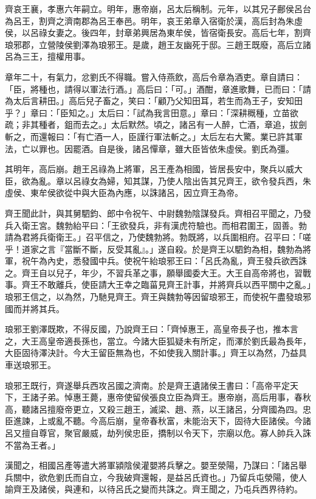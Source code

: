 \begin{pinyinscope}
齊哀王襄，孝惠六年嗣立。明年，惠帝崩，呂太后稱制。元年，以其兄子鄜侯呂台為呂王，割齊之濟南郡為呂王奉邑。明年，哀王弟章入宿衛於漢，高后封為朱虛侯，以呂祿女妻之。後四年，封章弟興居為東牟侯，皆宿衛長安。高后七年，割齊琅邪郡，立營陵侯劉澤為琅邪王。是歲，趙王友幽死于邸。三趙王既廢，高后立諸呂為三王，擅權用事。

章年二十，有氣力，忿劉氏不得職。嘗入侍燕飲，高后令章為酒吏。章自請曰：「臣，將種也，請得以軍法行酒。」高后曰：「可。」酒酣，章進歌舞，已而曰：「請為太后言耕田。」高后兒子畜之，笑曰：「顧乃父知田耳，若生而為王子，安知田乎？」章曰：「臣知之。」太后曰：「試為我言田意。」章曰：「深耕穊種，立苗欲疏；非其種者，鉏而去之。」太后默然。頃之，諸呂有一人醉，亡酒，章追，拔劍斬之，而還報曰：「有亡酒一人，臣謹行軍法斬之。」太后左右大驚。業已許其軍法，亡以罪也。因罷酒。自是後，諸呂憚章，雖大臣皆依朱虛侯。劉氏為彊。

其明年，高后崩。趙王呂祿為上將軍，呂王產為相國，皆居長安中，聚兵以威大臣，欲為亂。章以呂祿女為婦，知其謀，乃使人陰出告其兄齊王，欲令發兵西，朱虛侯、東牟侯欲從中與大臣為內應，以誅諸呂，因立齊王為帝。

齊王聞此計，與其舅駟鈞、郎中令祝午、中尉魏勃陰謀發兵。齊相召平聞之，乃發兵入衛王宮。魏勃紿平曰：「王欲發兵，非有漢虎符驗也。而相君圍王，固善。勃請為君將兵衛衛王。」召平信之，乃使魏勃將。勃既將，以兵圍相府。召平曰：「嗟乎！道家之言『當斷不斷，反受其亂』。」遂自殺。於是齊王以駟鈞為相，魏勃為將軍，祝午為內史，悉發國中兵。使祝午紿琅邪王曰：「呂氏為亂，齊王發兵欲西誅之。齊王自以兒子，年少，不習兵革之事，願舉國委大王。大王自高帝將也，習戰事。齊王不敢離兵，使臣請大王幸之臨菑見齊王計事，并將齊兵以西平關中之亂。」琅邪王信之，以為然，乃馳見齊王。齊王與魏勃等因留琅邪王，而使祝午盡發琅邪國而并將其兵。

琅邪王劉澤既欺，不得反國，乃說齊王曰：「齊悼惠王，高皇帝長子也，推本言之，大王高皇帝適長孫也，當立。今諸大臣狐疑未有所定，而澤於劉氏最為長年，大臣固待澤決計。今大王留臣無為也，不如使我入關計事。」齊王以為然，乃益具車送琅邪王。

琅邪王既行，齊遂舉兵西攻呂國之濟南。於是齊王遺諸侯王書曰：「高帝平定天下，王諸子弟。悼惠王薨，惠帝使留侯張良立臣為齊王。惠帝崩，高后用事，春秋高，聽諸呂擅廢帝更立，又殺三趙王，滅梁、趙、燕，以王諸呂，分齊國為四。忠臣進諫，上或亂不聽。今高后崩，皇帝春秋富，未能治天下，固待大臣諸侯。今諸呂又擅自尊官，聚官嚴威，劫列侯忠臣，撟制以令天下，宗廟以危。寡人帥兵入誅不當為王者。」

漢聞之，相國呂產等遣大將軍潁陰侯灌嬰將兵擊之。嬰至滎陽，乃謀曰：「諸呂舉兵關中，欲危劉氏而自立，今我破齊還報，是益呂氏資也。」乃留兵屯滎陽，使人諭齊王及諸侯，與連和，以待呂氏之變而共誅之。齊王聞之，乃屯兵西界待約。


\end{pinyinscope}
